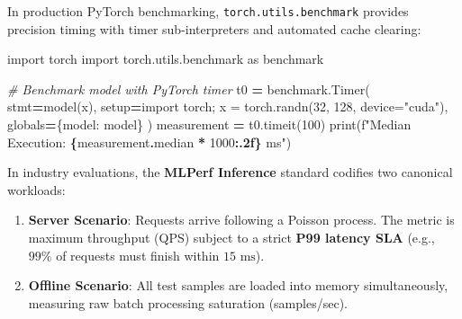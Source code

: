 \documentclass[
  letterpaper,
]{scrbook}
\newenvironment{Shaded}{\begin{snugshade}}{\end{snugshade}}
\newcommand{\BuiltInTok}[1]{#1}
\newcommand{\CommentTok}[1]{\textcolor[rgb]{0.56,0.35,0.01}{\textit{#1}}}
\newcommand{\DecValTok}[1]{\textcolor[rgb]{0.00,0.00,0.81}{#1}}
\newcommand{\ImportTok}[1]{#1}
\newcommand{\NormalTok}[1]{#1}
\newcommand{\OperatorTok}[1]{\textcolor[rgb]{0.81,0.36,0.00}{\textbf{#1}}}
\newcommand{\SpecialCharTok}[1]{\textcolor[rgb]{0.81,0.36,0.00}{\textbf{#1}}}
\newcommand{\SpecialStringTok}[1]{\textcolor[rgb]{0.31,0.60,0.02}{#1}}
\newcommand{\StringTok}[1]{\textcolor[rgb]{0.31,0.60,0.02}{#1}}
\providecommand{\tightlist}{%
  \setlength{\itemsep}{0pt}\setlength{\parskip}{0pt}}
\begin{document}
\begin{tcolorbox}[enhanced jigsaw, arc=.35mm, bottomrule=.15mm, bottomtitle=1mm, breakable, colback=white, colbacktitle=quarto-callout-note-color!10!white, colframe=quarto-callout-note-color-frame, coltitle=black, left=2mm, leftrule=.75mm, opacityback=0, opacitybacktitle=0.6, rightrule=.15mm, title=\textcolor{quarto-callout-note-color}{\faInfo}\hspace{0.5em}{PyTorch Systems Bridge: \texttt{torch.utils.benchmark} and MLPerf
Scenarios}, titlerule=0mm, toprule=.15mm, toptitle=1mm]

In production PyTorch benchmarking, \texttt{torch.utils.benchmark}
provides precision timing with timer sub-interpreters and automated
cache clearing:

\begin{Shaded}
\begin{Highlighting}[]
\ImportTok{import}\NormalTok{ torch}
\ImportTok{import}\NormalTok{ torch.utils.benchmark }\ImportTok{as}\NormalTok{ benchmark}

\CommentTok{\# Benchmark model with PyTorch timer}
\NormalTok{t0 }\OperatorTok{=}\NormalTok{ benchmark.Timer(}
\NormalTok{    stmt}\OperatorTok{=}\StringTok{\textquotesingle{}model(x)\textquotesingle{}}\NormalTok{,}
\NormalTok{    setup}\OperatorTok{=}\StringTok{\textquotesingle{}import torch; x = torch.randn(32, 128, device="cuda")\textquotesingle{}}\NormalTok{,}
    \BuiltInTok{globals}\OperatorTok{=}\NormalTok{\{}\StringTok{\textquotesingle{}model\textquotesingle{}}\NormalTok{: model\}}
\NormalTok{)}
\NormalTok{measurement }\OperatorTok{=}\NormalTok{ t0.timeit(}\DecValTok{100}\NormalTok{)}
\BuiltInTok{print}\NormalTok{(}\SpecialStringTok{f"Median Execution: }\SpecialCharTok{\{}\NormalTok{measurement}\SpecialCharTok{.}\NormalTok{median }\OperatorTok{*} \DecValTok{1000}\SpecialCharTok{:.2f\}}\SpecialStringTok{ ms"}\NormalTok{)}
\end{Highlighting}
\end{Shaded}

In industry evaluations, the \textbf{MLPerf Inference} standard codifies
two canonical workloads:

\begin{enumerate}
\def\labelenumi{\arabic{enumi}.}
\tightlist
\item
  \textbf{Server Scenario}: Requests arrive following a Poisson process.
  The metric is maximum throughput (QPS) subject to a strict \textbf{P99
  latency SLA} (e.g., \(99\%\) of requests must finish within
  \(15\text{ ms}\)).
\item
  \textbf{Offline Scenario}: All test samples are loaded into memory
  simultaneously, measuring raw batch processing saturation
  (samples/sec).
\end{enumerate}

\end{tcolorbox}
\end{document}

